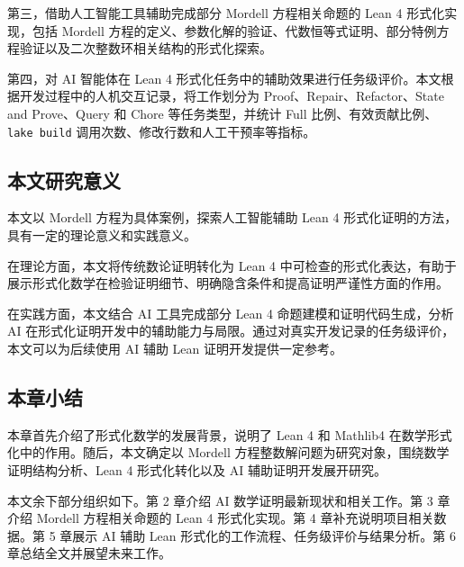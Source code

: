 第三，借助人工智能工具辅助完成部分 Mordell 方程相关命题的 Lean 4 形式化实现，包括 Mordell 方程的定义、参数化解的验证、代数恒等式证明、部分特例方程验证以及二次整数环相关结构的形式化探索。

第四，对 AI 智能体在 Lean 4 形式化任务中的辅助效果进行任务级评价。本文根据开发过程中的人机交互记录，将工作划分为 Proof、Repair、Refactor、State and Prove、Query 和 Chore 等任务类型，并统计 Full 比例、有效贡献比例、\texttt{lake build} 调用次数、修改行数和人工干预率等指标。

\subsection{本文研究意义}

本文以 Mordell 方程为具体案例，探索人工智能辅助 Lean 4 形式化证明的方法，具有一定的理论意义和实践意义。

在理论方面，本文将传统数论证明转化为 Lean 4 中可检查的形式化表达，有助于展示形式化数学在检验证明细节、明确隐含条件和提高证明严谨性方面的作用。

在实践方面，本文结合 AI 工具完成部分 Lean 4 命题建模和证明代码生成，分析 AI 在形式化证明开发中的辅助能力与局限。通过对真实开发记录的任务级评价，本文可以为后续使用 AI 辅助 Lean 证明开发提供一定参考。

\subsection{本章小结}

本章首先介绍了形式化数学的发展背景，说明了 Lean 4 和 Mathlib4 在数学形式化中的作用。随后，本文确定以 Mordell 方程整数解问题为研究对象，围绕数学证明结构分析、Lean 4 形式化转化以及 AI 辅助证明开发展开研究。

本文余下部分组织如下。第 2 章介绍 AI 数学证明最新现状和相关工作。第 3 章介绍 Mordell 方程相关命题的 Lean 4 形式化实现。第 4 章补充说明项目相关数据。第 5 章展示 AI 辅助 Lean 形式化的工作流程、任务级评价与结果分析。第 6 章总结全文并展望未来工作。
